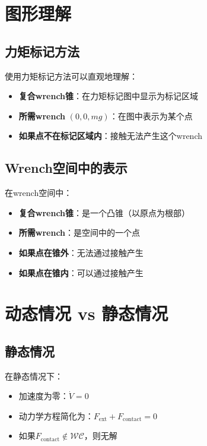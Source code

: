 \documentclass[12pt,a4paper]{article}
\begin{document}
\section{图形理解}

\subsection{力矩标记方法}

使用力矩标记方法可以直观地理解：

\begin{itemize}
    \item \textbf{复合wrench锥}：在力矩标记图中显示为标记区域
    \item \textbf{所需wrench} $(0, 0, mg)$：在图中表示为某个点
    \item \textbf{如果点不在标记区域内}：接触无法产生这个wrench
\end{itemize}

\subsection{Wrench空间中的表示}

在wrench空间中：

\begin{itemize}
    \item \textbf{复合wrench锥}：是一个凸锥（以原点为根部）
    \item \textbf{所需wrench}：是空间中的一个点
    \item \textbf{如果点在锥外}：无法通过接触产生
    \item \textbf{如果点在锥内}：可以通过接触产生
\end{itemize}

\section{动态情况 vs 静态情况}

\subsection{静态情况}

在静态情况下：
\begin{itemize}
    \item 加速度为零：$\dot{V} = 0$
    \item 动力学方程简化为：$F_{\text{ext}} + F_{\text{contact}} = 0$
    \item 如果$F_{\text{contact}} \notin \mathcal{WC}$，则无解
\end{itemize}
\end{document}
